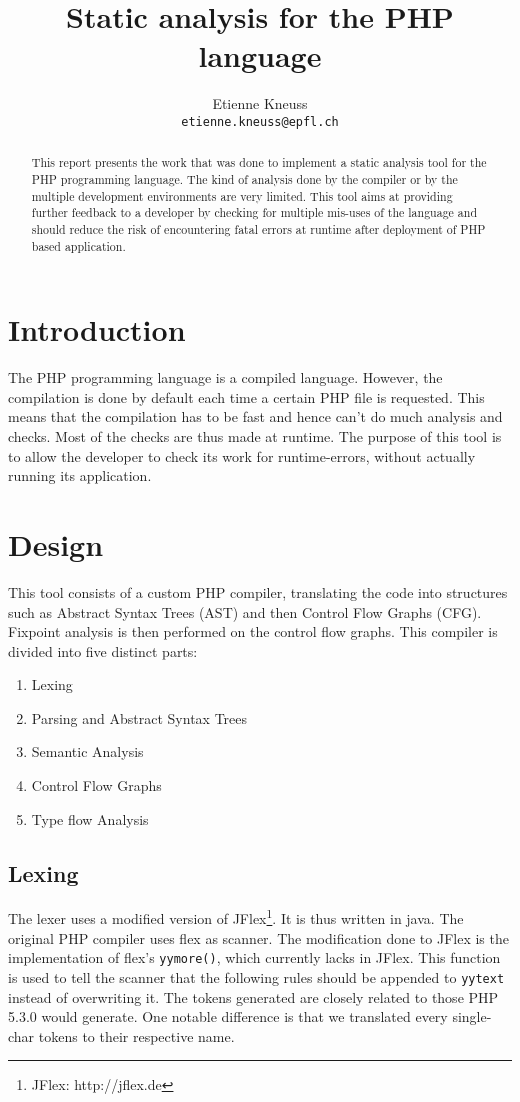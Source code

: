 \documentclass[a4paper]{article}
\author{Etienne Kneuss\\
\texttt{etienne.kneuss@epfl.ch}
}
\title{Static analysis for the PHP language}
\begin{document}
\maketitle
\begin{abstract}
  This report presents the work that was done to implement a static analysis
  tool for the PHP programming language. The kind of analysis done by the
  compiler or by the multiple development environments are very limited. This
  tool aims at providing further feedback to a developer by checking for
  multiple mis-uses of the language and should reduce the risk of encountering
  fatal errors at runtime after deployment of PHP based application.
\end{abstract}
\section{Introduction}
The PHP programming language is a compiled language. However, the compilation is
done by default each time a certain PHP file is requested. This means that the
compilation has to be fast and hence can't do much analysis and checks. Most of
the checks are thus made at runtime. The purpose of this tool is to allow the
developer to check its work for runtime-errors, without actually running its
application.
\section{Design}
This tool consists of a custom PHP compiler, translating the code
into structures such as Abstract Syntax Trees (AST) and then Control Flow Graphs
(CFG). Fixpoint analysis is then performed on the control flow graphs. This
compiler is divided into five distinct parts:
\begin{enumerate}
  \item Lexing
  \item Parsing and Abstract Syntax Trees
  \item Semantic Analysis
  \item Control Flow Graphs
  \item Type flow Analysis
\end{enumerate}

\subsection{Lexing}
The lexer uses a modified version of JFlex\footnote{JFlex: http://jflex.de}. It
is thus written in java. The original PHP compiler uses flex as scanner. The
modification done to JFlex is the implementation of flex's \verb=yymore()=,
which currently lacks in JFlex. This function is used to tell the scanner that
the following rules should be appended to \verb=yytext= instead of overwriting
it. The tokens generated are closely related to those PHP 5.3.0 would generate.
One notable difference is that we translated every single-char tokens to their
respective name.
\end{document}
